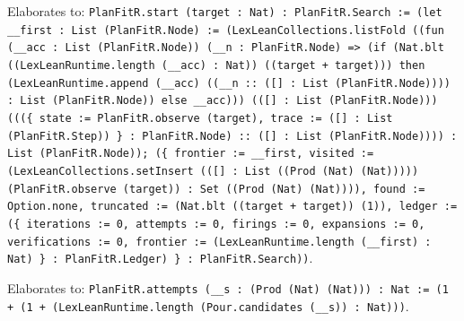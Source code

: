 \documentclass[11pt]{article}
\begin{document}
\noindent Elaborates to: \texttt{PlanFitR.start (target : Nat) : PlanFitR.Search := (let \_\_first : List (PlanFitR.Node) := (LexLeanCollections.listFold ((fun (\_\_acc : List (PlanFitR.Node)) (\_\_n : PlanFitR.Node) => (if (Nat.blt ((LexLeanRuntime.length (\_\_acc) : Nat)) ((target + target))) then (LexLeanRuntime.append (\_\_acc) ((\_\_n :: ([] : List (PlanFitR.Node)))) : List (PlanFitR.Node)) else \_\_acc))) (([] : List (PlanFitR.Node))) (((\{ state := PlanFitR.observe (target), trace := ([] : List (PlanFitR.Step)) \} : PlanFitR.Node) :: ([] : List (PlanFitR.Node)))) : List (PlanFitR.Node)); (\{ frontier := \_\_first, visited := (LexLeanCollections.setInsert (([] : List ((Prod (Nat) (Nat))))) (PlanFitR.observe (target)) : Set ((Prod (Nat) (Nat)))), found := Option.none, truncated := (Nat.blt ((target + target)) (1)), ledger := (\{ iterations := 0, attempts := 0, firings := 0, expansions := 0, verifications := 0, frontier := (LexLeanRuntime.length (\_\_first) : Nat) \} : PlanFitR.Ledger) \} : PlanFitR.Search))}.\par
\noindent Elaborates to: \texttt{PlanFitR.attempts (\_\_s : (Prod (Nat) (Nat))) : Nat := (1 + (1 + (LexLeanRuntime.length (Pour.candidates (\_\_s)) : Nat)))}.\par
\end{document}
